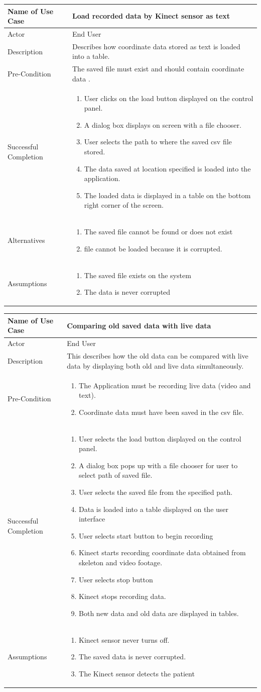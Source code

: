 \documentclass[a4paper, 12pt]{article}
\newcommand\addrow[2]{#1 &#2\\ }
\newcommand\addheading[2]{#1 &#2\\ \hline}
\newcommand\tabularhead{\begin{tabular}{lp{8cm}}
\hline
}
\newcommand\addmulrow[2]{ \begin{minipage}[t][][t]{2.5cm}#1\end{minipage}%
   &\begin{minipage}[t][][t]{8cm}
    \begin{enumerate} #2   \end{enumerate}
    \end{minipage}\\ }
\newenvironment{usecase}{\tabularhead}
{\hline\end{tabular}}
\begin{document}
\begin{usecase}
	\addheading{Name of Use Case}{Load recorded data by Kinect sensor as text }
	\addrow{Actor}{End User}
	\addrow{Description}{Describes how coordinate data stored as text is loaded into a table.}
	\addrow{Pre-Condition}{The saved file must exist and should contain coordinate data .}
	\addmulrow{Successful Completion}{
		\item User clicks on the load button displayed on the control panel. 
		\item A dialog box displays on screen with a file chooser. 
		\item User selects the path to where the saved csv file stored.
		\item The data saved at location specified is loaded into the application.
		\item The loaded data is displayed in a table on the bottom right corner of the screen.}
	\addmulrow{Alternatives}{ 
	\item The saved file cannot be found or does not exist 
	\item file cannot be loaded because it is corrupted.}
	\addmulrow{Assumptions}{
	\item The saved file exists on the system 
	\item The data is never corrupted}
\end{usecase}


\begin{usecase}
	\addheading{Name of Use Case}{Comparing old saved data with live data}
	\addrow{Actor}{End User}
	\addrow{Description}{This describes how the old data can be compared with live data by displaying both old and live data simultaneously.}
	\addmulrow{Pre-Condition}{
	\item The Application must be recording live data (video and text).
	\item Coordinate data must have been saved in the csv file.}							
	\addmulrow{Successful Completion}{
		\item User selects the load button displayed on the control panel. 
		\item A dialog box pops up with a file chooser for user to select path of saved file.
		\item User selects the saved file from the specified path. 
		\item Data is loaded into a table displayed on the user interface
		\item User selects start button to begin recording
		\item Kinect starts recording coordinate data obtained from skeleton and video footage.
		\item User selects stop button
		\item Kinect stops recording data. 
		\item Both new data and old data are displayed in tables.}
	\addmulrow{Assumptions}{
	\item Kinect sensor never turns off. 
	\item The saved data is never corrupted.
	\item The Kinect sensor detects the patient}
\end{usecase}
\end{document}
